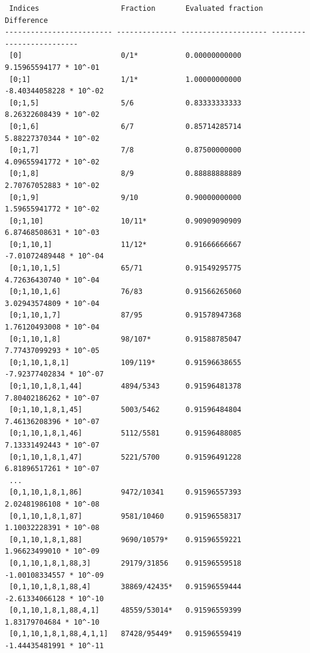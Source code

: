 \documentclass[a4paper,10pt]{article}
\begin{document}
\begin{verbatim}
 Indices                   Fraction       Evaluated fraction   Difference              
------------------------- -------------- -------------------- -------------------------
 [0]                       0/1*           0.00000000000         9.15965594177 * 10^-01 
 [0;1]                     1/1*           1.00000000000        -8.40344058228 * 10^-02 
 [0;1,5]                   5/6            0.83333333333         8.26322608439 * 10^-02 
 [0;1,6]                   6/7            0.85714285714         5.88227370344 * 10^-02 
 [0;1,7]                   7/8            0.87500000000         4.09655941772 * 10^-02 
 [0;1,8]                   8/9            0.88888888889         2.70767052883 * 10^-02 
 [0;1,9]                   9/10           0.90000000000         1.59655941772 * 10^-02 
 [0;1,10]                  10/11*         0.90909090909         6.87468508631 * 10^-03 
 [0;1,10,1]                11/12*         0.91666666667        -7.01072489448 * 10^-04 
 [0;1,10,1,5]              65/71          0.91549295775         4.72636430740 * 10^-04 
 [0;1,10,1,6]              76/83          0.91566265060         3.02943574809 * 10^-04 
 [0;1,10,1,7]              87/95          0.91578947368         1.76120493008 * 10^-04 
 [0;1,10,1,8]              98/107*        0.91588785047         7.77437099293 * 10^-05 
 [0;1,10,1,8,1]            109/119*       0.91596638655        -7.92377402834 * 10^-07 
 [0;1,10,1,8,1,44]         4894/5343      0.91596481378         7.80402186262 * 10^-07 
 [0;1,10,1,8,1,45]         5003/5462      0.91596484804         7.46136208396 * 10^-07 
 [0;1,10,1,8,1,46]         5112/5581      0.91596488085         7.13331492443 * 10^-07 
 [0;1,10,1,8,1,47]         5221/5700      0.91596491228         6.81896517261 * 10^-07 
 ...
 [0,1,10,1,8,1,86]         9472/10341     0.91596557393         2.02481986108 * 10^-08 
 [0,1,10,1,8,1,87]         9581/10460     0.91596558317         1.10032228391 * 10^-08 
 [0,1,10,1,8,1,88]         9690/10579*    0.91596559221         1.96623499010 * 10^-09 
 [0,1,10,1,8,1,88,3]       29179/31856    0.91596559518        -1.00108334557 * 10^-09 
 [0,1,10,1,8,1,88,4]       38869/42435*   0.91596559444        -2.61334066128 * 10^-10 
 [0,1,10,1,8,1,88,4,1]     48559/53014*   0.91596559399         1.83179704684 * 10^-10 
 [0,1,10,1,8,1,88,4,1,1]   87428/95449*   0.91596559419        -1.44435481991 * 10^-11 
\end{verbatim}

\end{document}
